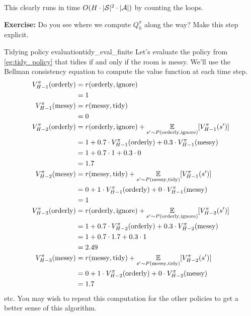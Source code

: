 \documentclass[\main/main]{subfiles}
\begin{document}
This clearly runs in time $O(H \cdot |\mathcal{S}|^2 \cdot |\mathcal{A}|)$ by counting the loops.

\textbf{Exercise:} Do you see where we compute $Q^\pi_h$ along the way? Make this step explicit.


\begin{example}{Tidying policy evaluation}{tidy_eval_finite}
    Let's evaluate the policy from \ref{eg:tidy_policy} that tidies if and only if the room is messy. We'll use the Bellman consistency equation to compute the value function at each time step.
    \begin{align*}
        V_{H-1}^\pi(\text{orderly}) &= r(\text{orderly}, \text{ignore}) \\
        &= 1 \\
        V_{H-1}^\pi(\text{messy}) &= r(\text{messy}, \text{tidy}) \\
        &= 0 \\
        V_{H-2}^\pi(\text{orderly}) &= r(\text{orderly}, \text{ignore}) + \operatorname*{\mathbb{E}}_{s' \sim P(\text{orderly}, \text{ignore})} [V_{H-1}^\pi(s')] \\
        &= 1 + 0.7 \cdot V_{H-1}^{\pi}(\text{orderly}) + 0.3 \cdot V_{H-1}^{\pi}(\text{messy}) \\
        &= 1 + 0.7 \cdot 1 + 0.3 \cdot 0 \\
        &= 1.7 \\
        V_{H-2}^\pi(\text{messy}) &= r(\text{messy}, \text{tidy}) + \operatorname*{\mathbb{E}}_{s' \sim P(\text{messy}, \text{tidy})} [V_{H-1}^\pi(s')] \\
        &= 0 + 1 \cdot V_{H-1}^{\pi}(\text{orderly}) + 0 \cdot V_{H-1}^{\pi}(\text{messy}) \\
        &= 1 \\
        V_{H-3}^\pi(\text{orderly}) &= r(\text{orderly}, \text{ignore}) + \operatorname*{\mathbb{E}}_{s' \sim P(\text{orderly}, \text{ignore})} [V_{H-2}^\pi(s')] \\
        &= 1 + 0.7 \cdot V_{H-2}^{\pi}(\text{orderly}) + 0.3 \cdot V_{H-2}^{\pi}(\text{messy}) \\
        &= 1 + 0.7 \cdot 1.7 + 0.3 \cdot 1 \\
        &= 2.49 \\
        V_{H-3}^\pi(\text{messy}) &= r(\text{messy}, \text{tidy}) + \operatorname*{\mathbb{E}}_{s' \sim P(\text{messy}, \text{tidy})} [V_{H-2}^\pi(s')] \\
        &= 0 + 1 \cdot V_{H-2}^{\pi}(\text{orderly}) + 0 \cdot V_{H-2}^{\pi}(\text{messy}) \\
        &= 1.7
    \end{align*}
    etc. You may wish to repeat this computation for the other policies to get a better sense of this algorithm.
\end{example}
\end{document}
